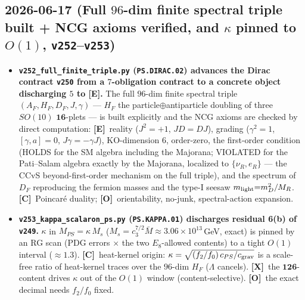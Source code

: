 \documentclass[11pt]{article}
\providecommand{\mE}{\textbf{[E]}}\providecommand{\mC}{\textbf{[C]}}
\providecommand{\mO}{\textbf{[O]}}\providecommand{\mX}{\textbf{[X]}}
\providecommand{\vref}[1]{\texttt{#1}}
\begin{document}
\subsection*{2026-06-17 (Full $96$-dim finite spectral triple built + NCG axioms verified, and $\kappa$ pinned to $O(1)$, \texttt{v252}--\texttt{v253})}
\begin{itemize}
\item \textbf{\texttt{v252\_full\_finite\_triple.py} (\texttt{PS.DIRAC.02}) advances the Dirac contract
  \vref{v250} from a $7$-obligation contract to a concrete object discharging $5$ to \mE.} The full
  $96$-dim finite spectral triple $(A_F,H_F,D_F,J,\gamma)$ --- $H_F$ the particle$\oplus$antiparticle
  doubling of three $SO(10)$ $\mathbf{16}$-plets --- is built explicitly and the NCG axioms are checked by
  direct computation: \mE\ reality ($J^2{=}{+}1$, $JD{=}DJ$), grading ($\gamma^2{=}1$, $[\gamma,a]{=}0$,
  $J\gamma{=}{-}\gamma J$), KO-dimension $6$, order-zero, the first-order condition (HOLDS for the SM algebra
  including the Majorana; VIOLATED for the Pati--Salam algebra exactly by the Majorana, localized to
  $\{\nu_R,e_R\}$ --- the CCvS beyond-first-order mechanism on the full triple), and the spectrum of $D_F$
  reproducing the fermion masses and the type-I seesaw $m_{\rm light}{=}m_D^2/M_R$. \mC\ Poincar\'e duality;
  \mO\ orientability, no-junk, spectral-action expansion.
\item \textbf{\texttt{v253\_kappa\_scalaron\_ps.py} (\texttt{PS.KAPPA.01}) discharges residual 6(b) of
  \vref{v249}.} $\kappa$ in $M_{PS}=\kappa\,M_s$ ($M_s=c_3^{7/2}\bar M\approx3.06{\times}10^{13}$\,GeV, exact)
  is pinned by an RG scan (PDG errors $\times$ the two $E_8$-allowed contents) to a tight $O(1)$ interval
  ($\approx1.3$). \mC\ heat-kernel origin: $\kappa=\sqrt{(f_2/f_0)\,c_{PS}/c_{\rm grav}}$ is a scale-free
  ratio of heat-kernel traces over the $96$-dim $H_F$ ($\Lambda$ cancels). \mX\ the $\mathbf{126}$-content
  drives $\kappa$ out of the $O(1)$ window (content-selective). \mO\ the exact decimal needs $f_2/f_0$ fixed.
\end{itemize}
\end{document}
